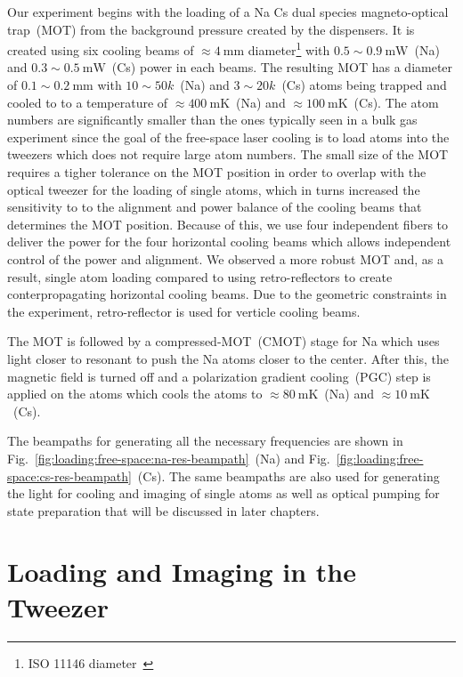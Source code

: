 Our experiment begins with the loading of a Na Cs dual species magneto-optical trap~(MOT)
from the background pressure created by the dispensers.
It is created using six cooling beams of $\approx\!4~\mathrm{mm}$ diameter\footnote{
  ISO 11146 diameter~\cite{isotc_172sc_9_iso_2005,dataray_inc_wincamd_2018}}
with $0.5\sim0.9~\mathrm{mW}$~(Na) and $0.3\sim0.5~\mathrm{mW}$~(Cs)
power in each beams.
The resulting MOT has a diameter of $0.1\sim0.2~\mathrm{mm}$
with $10\sim50k$~(Na) and $3\sim20k$~(Cs) atoms being trapped
and cooled to to a temperature of $\approx\!400~\mathrm{mK}$~(Na)
and $\approx\!100~\mathrm{mK}$~(Cs).
The atom numbers are significantly smaller than the ones typically seen in a bulk gas experiment
since the goal of the free-space laser cooling is to load atoms into the tweezers
which does not require large atom numbers.
The small size of the MOT requires a tigher tolerance on the MOT position
in order to overlap with the optical tweezer for the loading of single atoms,
which in turns increased the sensitivity to to the alignment
and power balance of the cooling beams that determines the MOT position.
Because of this, we use four independent fibers to deliver the power
for the four horizontal cooling beams which allows independent control
of the power and alignment.
We observed a more robust MOT and, as a result, single atom loading
compared to using retro-reflectors to create conterpropagating horizontal cooling beams.
Due to the geometric constraints in the experiment,
retro-reflector is used for verticle cooling beams.

The MOT is followed by a compressed-MOT~(CMOT) stage for Na
which uses light closer to resonant to push the Na atoms closer to the center.
After this, the magnetic field is turned off and
a polarization gradient cooling~(PGC) step is applied on the atoms
which cools the atoms to $\approx\!80~\mathrm{mK}$~(Na)
and $\approx\!10~\mathrm{mK}$~(Cs).

The beampaths for generating all the necessary frequencies are shown in
Fig.~\ref{fig:loading:free-space:na-res-beampath}~(Na) and
Fig.~\ref{fig:loading:free-space:cs-res-beampath}~(Cs).
The same beampaths are also used for generating the light for cooling
and imaging of single atoms as well as optical pumping for state preparation
that will be discussed in later chapters.

\section{Loading and Imaging in the Tweezer}
\label{ch:loading:loading}

